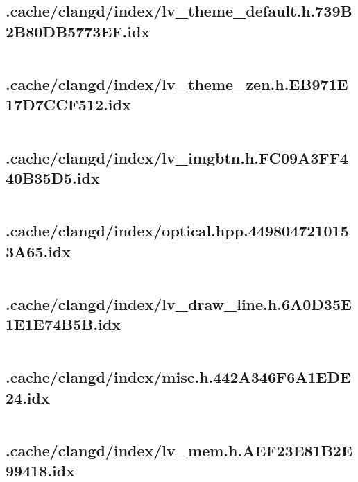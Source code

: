 \subsection{.cache/clangd/index/lv_theme_default.h.739B2B80DB5773EF.idx}
\inputminted[linenos,tabsize=2,breaklines, breakanywhere]{c}{lv_theme_default.h.739B2B80DB5773EF.idx}
\pagebreak

\subsection{.cache/clangd/index/lv_theme_zen.h.EB971E17D7CCF512.idx}
\inputminted[linenos,tabsize=2,breaklines, breakanywhere]{c}{lv_theme_zen.h.EB971E17D7CCF512.idx}
\pagebreak

\subsection{.cache/clangd/index/lv_imgbtn.h.FC09A3FF440B35D5.idx}
\inputminted[linenos,tabsize=2,breaklines, breakanywhere]{c}{lv_imgbtn.h.FC09A3FF440B35D5.idx}
\pagebreak

\subsection{.cache/clangd/index/optical.hpp.4498047210153A65.idx}
\inputminted[linenos,tabsize=2,breaklines, breakanywhere]{c}{optical.hpp.4498047210153A65.idx}
\pagebreak

\subsection{.cache/clangd/index/lv_draw_line.h.6A0D35E1E1E74B5B.idx}
\inputminted[linenos,tabsize=2,breaklines, breakanywhere]{c}{lv_draw_line.h.6A0D35E1E1E74B5B.idx}
\pagebreak

\subsection{.cache/clangd/index/misc.h.442A346F6A1EDE24.idx}
\inputminted[linenos,tabsize=2,breaklines, breakanywhere]{c}{misc.h.442A346F6A1EDE24.idx}
\pagebreak

\subsection{.cache/clangd/index/lv_mem.h.AEF23E81B2E99418.idx}
\inputminted[linenos,tabsize=2,breaklines, breakanywhere]{c}{lv_mem.h.AEF23E81B2E99418.idx}
\pagebreak

